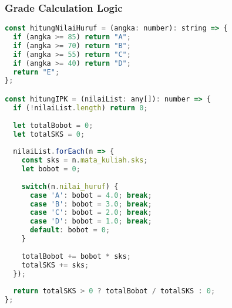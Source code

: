 \documentclass[12pt,a4paper]{article}
\begin{document}
\subsubsection{Grade Calculation Logic}
\begin{lstlisting}[language=JavaScript]
const hitungNilaiHuruf = (angka: number): string => {
  if (angka >= 85) return "A";
  if (angka >= 70) return "B";
  if (angka >= 55) return "C";
  if (angka >= 40) return "D";
  return "E";
};

const hitungIPK = (nilaiList: any[]): number => {
  if (!nilaiList.length) return 0;
  
  let totalBobot = 0;
  let totalSKS = 0;
  
  nilaiList.forEach(n => {
    const sks = n.mata_kuliah.sks;
    let bobot = 0;
    
    switch(n.nilai_huruf) {
      case 'A': bobot = 4.0; break;
      case 'B': bobot = 3.0; break;
      case 'C': bobot = 2.0; break;
      case 'D': bobot = 1.0; break;
      default: bobot = 0;
    }
    
    totalBobot += bobot * sks;
    totalSKS += sks;
  });
  
  return totalSKS > 0 ? totalBobot / totalSKS : 0;
};
\end{lstlisting}
\end{document}
